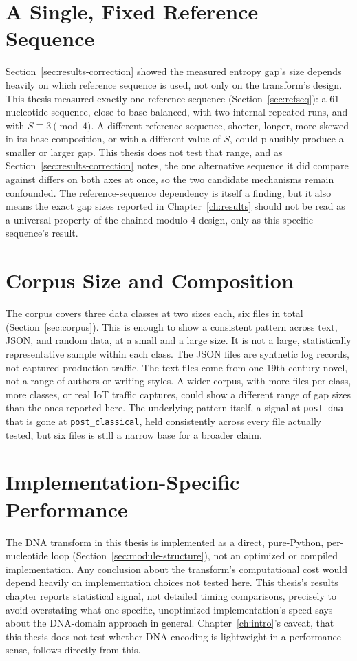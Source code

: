 \documentclass[12pt,a4paper,twoside]{report}
\numberwithin{equation}{chapter}
\begin{document}
\section{A Single, Fixed Reference Sequence}
Section~\ref{sec:results-correction} showed the measured entropy gap's
size depends heavily on which reference sequence is used, not only on
the transform's design. This thesis measured exactly one reference
sequence (Section~\ref{sec:refseq}): a 61-nucleotide sequence,
close to base-balanced, with two internal repeated runs, and with
$S \equiv 3 \pmod 4$. A different reference
sequence, shorter, longer, more skewed in its base composition, or with
a different value of $S$, could plausibly produce a smaller or larger
gap. This thesis does not test that range, and as
Section~\ref{sec:results-correction} notes, the one alternative
sequence it did compare against differs on both axes at once, so the
two candidate mechanisms remain confounded. The reference-sequence
dependency is itself a finding, but it also means the
exact gap sizes reported in Chapter~\ref{ch:results} should not be read
as a universal property of the chained modulo-4 design, only as this
specific sequence's result.

\section{Corpus Size and Composition}
The corpus covers three data classes at two sizes each, six files in
total (Section~\ref{sec:corpus}). This is enough to show a consistent
pattern across text, JSON, and random data, at a small and a large
size. It is not a large, statistically representative sample within
each class. The JSON files are synthetic log records, not captured
production traffic. The text files come from one 19th-century novel,
not a range of authors or writing styles. A wider corpus, with more
files per class, more classes, or real IoT traffic captures, could show
a different range of gap sizes than the ones reported here. The
underlying pattern itself, a signal at \texttt{post\_dna} that is
gone at \texttt{post\_classical}, held consistently across every file
actually tested, but six files is still a narrow base for a broader
claim.

\section{Implementation-Specific Performance}
\label{sec:limits-performance}
The DNA transform in this thesis is implemented as a direct,
pure-Python, per-nucleotide loop (Section~\ref{sec:module-structure}),
not an optimized or compiled implementation. Any conclusion about the
transform's computational cost would depend heavily on implementation
choices not tested here.
This thesis's results chapter reports statistical signal, not detailed
timing comparisons, precisely to avoid overstating what one specific,
unoptimized implementation's speed says about the DNA-domain approach
in general. Chapter~\ref{ch:intro}'s caveat, that this thesis does not
test whether DNA encoding is lightweight in a performance sense,
follows directly from this.
\end{document}
